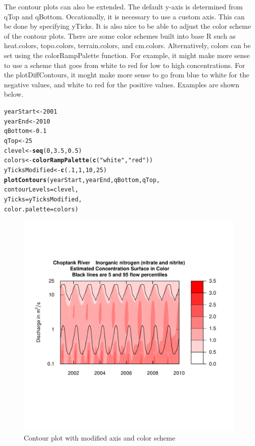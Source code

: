 \documentclass[a4paper,11pt]{article}\usepackage{graphicx, color}
\makeatletter
\newcommand{\hlfunctioncall}[1]{\textcolor[rgb]{0.501960784313725,0,0.329411764705882}{\textbf{#1}}}%
\newcommand{\hlstring}[1]{\textcolor[rgb]{0.6,0.6,1}{#1}}%
\newenvironment{kframe}{%
 \def\at@end@of@kframe{}%
 \ifinner\ifhmode%
  \def\at@end@of@kframe{\end{minipage}}%
  \begin{minipage}{\columnwidth}%
 \fi\fi%
 \def\FrameCommand##1{\hskip\@totalleftmargin \hskip-\fboxsep
 \colorbox{shadecolor}{##1}\hskip-\fboxsep
     \hskip-\linewidth \hskip-\@totalleftmargin \hskip\columnwidth}%
 \MakeFramed {\advance\hsize-\width
   \@totalleftmargin\z@ \linewidth\hsize
   \@setminipage}}%
 {\par\unskip\endMakeFramed%
 \at@end@of@kframe}
\newenvironment{knitrout}{}{} %
\makeatother
\begin{document}
The contour plots can also be extended. The default y-axis is determined from qTop and qBottom. Occationally, it is necessary to use a custom axis. This can be done by specifying yTicks. It is also nice to be able to adjust the color scheme of the contour plots. There are some color schemes built into base R such as heat.colors, topo.colors, terrain.colors, and cm.colors. Alternatively, colors can be set using the colorRampPalette function. For example, it might make more sense to use a scheme that goes from white to red for low to high concentrations. For the plotDiffContours, it moght make more sense to go from blue to white for the negative values, and white to red for the positive values. Examples are shown below.

\begin{knitrout}
\color{fgcolor}\begin{kframe}
\begin{alltt}
yearStart <- 2001
yearEnd <- 2010
qBottom <- 0.1
qTop<- 25
clevel <- \hlfunctioncall{seq}(0,3.5,0.5)
colors <- \hlfunctioncall{colorRampPalette}(\hlfunctioncall{c}(\hlstring{"white"},\hlstring{"red"}))
yTicksModified <- \hlfunctioncall{c}(.1,1,10,25)
\hlfunctioncall{plotContours}(yearStart,yearEnd,qBottom,qTop, 
             contourLevels = clevel,
             yTicks=yTicksModified,
             color.palette=colors)  
\end{alltt}
\end{kframe}\begin{figure}[]

\includegraphics[width=1\linewidth,height=1\linewidth]{figure/modifiedContour1} \caption[Contour plot with modified axis and color scheme]{Contour plot with modified axis and color scheme\label{fig:modifiedContour1}}
\end{figure}


\end{knitrout}
\end{document}
